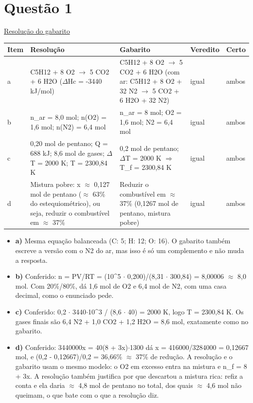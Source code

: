 \documentclass{article}%
\begin{document}
\section*{Questão 1}%
\href{https://poliedroresolve.sistemapoliedro.com.br/vestibulares/ita/2027/ita-2-fase-dia-2-21-10-2026-2-fase-dia-2/dissertativa-1-quimica-2-fase-dia-2-ita-2027}{Resolução do gabarito}\par\smallskip%
\begin{longtable}{@{}p{} p{} p{} p{} p{}@{}}\toprule Item & Resolução & Gabarito & Veredito & Certo \\ \midrule
a & C5H12 + 8 O2 $\to$ 5 CO2 + 6 H2O ($\Delta$Hc = -3440 kJ/mol) & C5H12 + 8 O2 $\to$ 5 CO2 + 6 H2O (com ar: C5H12 + 8 O2 + 32 N2 $\to$ 5 CO2 + 6 H2O + 32 N2) & igual & ambos \\
b & n\_ar = 8,0 mol; n(O2) = 1,6 mol; n(N2) = 6,4 mol & n\_ar = 8 mol; O2 = 1,6 mol; N2 = 6,4 mol & igual & ambos \\
c & 0,20 mol de pentano; Q = 688 kJ; 8,6 mol de gases; $\Delta$T = 2000 K; T = 2300,84 K & 0,2 mol de pentano; $\Delta$T = 2000 K $\Rightarrow$ T\_f = 2300,84 K & igual & ambos \\
d & Mistura pobre: x $\approx$ 0,127 mol de pentano ($\approx$ 63\% do estequiométrico), ou seja, reduzir o combustível em $\approx$ 37\% & Reduzir o combustível em $\approx$ 37\% (0,1267 mol de pentano, mistura pobre) & igual & ambos \\
\bottomrule\end{longtable}%
\begin{itemize}%
\item%
\textbf{a)} Mesma equação balanceada (C: 5; H: 12; O: 16). O gabarito também escreve a versão com o N2 do ar, mas isso é só um complemento e não muda a resposta.%
\item%
\textbf{b)} Conferido: n = PV/RT = (10\^{}5 $\cdot$ 0,200)/(8,31 $\cdot$ 300,84) = 8,00006 $\approx$ 8,0 mol. Com 20\%/80\%, dá 1,6 mol de O2 e 6,4 mol de N2, com uma casa decimal, como o enunciado pede.%
\item%
\textbf{c)} Conferido: 0,2 $\cdot$ 3440$\cdot$10\^{}3 / (8,6 $\cdot$ 40) = 2000 K, logo T = 2300,84 K. Os gases finais são 6,4 N2 + 1,0 CO2 + 1,2 H2O = 8,6 mol, exatamente como no gabarito.%
\item%
\textbf{d)} Conferido: 3440000x = 40(8 + 3x)$\cdot$1300 dá x = 416000/3284000 = 0,12667 mol, e (0,2 - 0,12667)/0,2 = 36,66\% $\approx$ 37\% de redução. A resolução e o gabarito usam o mesmo modelo: o O2 em excesso entra na mistura e n\_f = 8 + 3x. A resolução também justifica por que descartou a mistura rica: refiz a conta e ela daria $\approx$ 4,8 mol de pentano no total, dos quais $\approx$ 4,6 mol não queimam, o que bate com o que a resolução diz.%
\end{itemize}%
\end{document}
